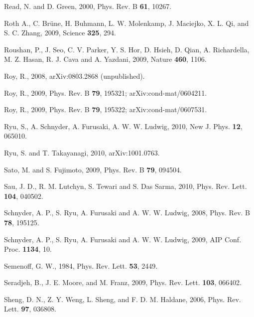 \documentclass[twocolumn,floatfix,showpacs,rmp,aps]{revtex4}
\begin{document}
\begin{thebibliography}{99}
		Read, N. and D. Green, 2000,
		Phys. Rev. B {\bf 61}, 10267.
		
		Roth A., C. Br\"une, H. Buhmann, L. W. Molenkamp, J. Maciejko, X. L. Qi, and S. C. Zhang, 2009,
		Science {\bf 325}, 294.
		
		Roushan, P., J. Seo, C. V. Parker, Y. S. Hor, D. Hsieh, D. Qian, A. Richardella, M. Z. Hasan,
		R. J. Cava and A. Yazdani, 2009,
		Nature {\bf 460}, 1106.
		
		Roy, R., 2008,
		arXiv:0803.2868 (unpublished).
		
		Roy, R., 2009,
		Phys. Rev. B {\bf 79}, 195321; arXiv:cond-mat/0604211.
		
		Roy, R., 2009,
		Phys. Rev. B {\bf 79}, 195322; arXiv:cond-mat/0607531.
		
		Ryu, S., A. Schnyder, A. Furusaki, A. W. W.  Ludwig, 2010,
		New J. Phys. {\bf 12}, 065010.
		
		Ryu, S. and T. Takayanagi, 2010,
		arXiv:1001.0763.
		
		Sato, M. and S. Fujimoto, 2009,
		Phys. Rev. B {\bf 79}, 094504.
		
		Sau, J. D., R. M. Lutchyn, S. Tewari and S. Das Sarma, 2010,
		Phys. Rev. Lett. {\bf 104}, 040502.
		
		Schnyder, A. P., S. Ryu, A. Furusaki and A. W. W. Ludwig, 2008,
		Phys. Rev. B {\bf 78}, 195125.
		
		Schnyder, A. P., S. Ryu, A. Furusaki and A. W. W. Ludwig, 2009,
		AIP Conf. Proc. {\bf 1134}, 10.
		
		Semenoff, G. W., 1984,
		Phys. Rev. Lett. {\bf 53}, 2449.
		
		Seradjeh, B., J. E. Moore, and M. Franz, 2009,
		Phys. Rev. Lett. {\bf 103}, 066402.
		
		Sheng, D. N., Z. Y. Weng, L. Sheng, and F. D. M. Haldane, 2006,
		Phys. Rev. Lett. {\bf 97}, 036808.
		

\end{thebibliography}
\end{document}
